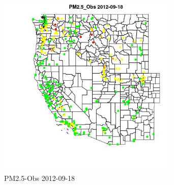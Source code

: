 \begin{figure} 
\centering  
\includegraphics[width=0.77\textwidth]{Code_Outputs/ML_input_report_ML_input_PM25_Step5_part_d_de_duplicated_aves_ML_input_MapObsPM25_Obs2012-09-18.jpg} 
\caption{\label{fig:ML_input_report_ML_input_PM25_Step5_part_d_de_duplicated_aves_ML_inputMapObsPM25_Obs2012-09-18}PM2.5-Obs 2012-09-18} 
\end{figure} 
 
